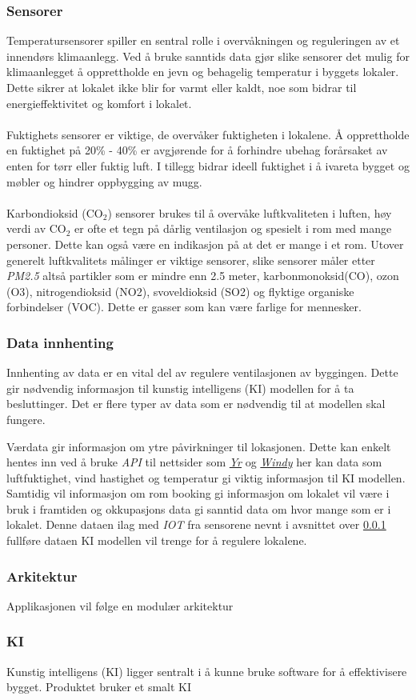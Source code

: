 \subsubsection{Sensorer}\label{section:sensors}
Temperatursensorer spiller en sentral rolle i overvåkningen og reguleringen av et innendørs klimaanlegg. Ved å bruke sanntids data gjør slike sensorer det mulig for klimaanlegget å opprettholde en jevn og behagelig temperatur i byggets lokaler. Dette sikrer at lokalet ikke blir for varmt eller kaldt, noe som bidrar til energieffektivitet og komfort i lokalet.
\\
\\
Fuktighets sensorer er viktige, de overvåker fuktigheten i lokalene. Å opprettholde en fuktighet på 20\% - 40\% er avgjørende for å forhindre ubehag forårsaket  av enten for tørr eller fuktig luft. I tillegg bidrar ideell fuktighet i å ivareta bygget og møbler og hindrer oppbygging av mugg. 
\\
\\
Karbondioksid (CO$_2$) sensorer brukes til å overvåke luftkvaliteten i luften, høy verdi av CO$_2$ er ofte et tegn på dårlig ventilasjon og spesielt i rom med mange personer. Dette kan også være en indikasjon på at det er mange i et rom. Utover generelt luftkvalitets målinger er viktige sensorer, slike sensorer måler etter \textit{PM2.5} altså partikler som er mindre enn 2.5 \micro \hspace{1mm}meter, karbonmonoksid(CO), ozon (O3), nitrogendioksid (NO2), svoveldioksid (SO2) og flyktige organiske forbindelser (VOC). Dette er gasser som kan være farlige for mennesker. 


\subsubsection{Data innhenting}
Innhenting av data er en vital del av regulere ventilasjonen av byggingen. Dette gir nødvendig informasjon til kunstig intelligens (KI) modellen for å ta besluttinger. Det er flere typer av data som er nødvendig til at modellen skal fungere.

Værdata gir informasjon om ytre påvirkninger til lokasjonen. Dette kan enkelt hentes inn ved å bruke \textit{API} til nettsider som \href{https://developer.yr.no/}{\textit{Yr}} og \href{https://api.windy.com/point-forecast/docs#parameters}{\textit{Windy}} her kan data som luftfuktighet, vind hastighet og temperatur gi viktig informasjon til KI modellen. Samtidig vil informasjon om rom booking gi informasjon om lokalet vil være i bruk i framtiden og okkupasjons data gi sanntid data om hvor mange som er i lokalet. Denne dataen ilag med \textit{IOT} fra sensorene nevnt i avsnittet over \ref{section:sensors} fullføre dataen KI modellen vil trenge for å regulere lokalene. 



\subsubsection{Arkitektur}
Applikasjonen vil følge en modulær arkitektur 
\subsubsection{KI}
Kunstig intelligens (KI) ligger sentralt i å kunne bruke software for å effektivisere bygget. Produktet bruker et smalt KI